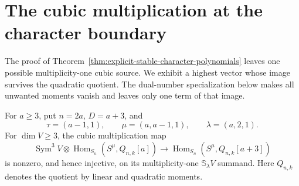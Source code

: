 \section{The cubic multiplication at the character boundary}
\label{app:cubic-witness}

The proof of Theorem~\ref{thm:explicit-stable-character-polynomials}
leaves one possible multiplicity-one cubic source. We exhibit a
highest vector whose image survives the quadratic quotient. The
dual-number specialization below makes all unwanted moments vanish
and leaves only one term of that image.

\begin{lemma}
\label{lem:cubic-witness}
For $a\ge3$, put $n=2a$, $D=a+3$, and
\[
 \tau=(a-1,1),\qquad\mu=(a,a-1,1),\qquad\lambda=(a,2,1).
\]
For $\dim V\ge3$, the cubic multiplication map
\[
 \operatorname{Sym}^3V\otimes
       \operatorname{Hom}_{S_n}(S^\mu,Q_{n,k}[a])
      \longrightarrow\operatorname{Hom}_{S_n}(S^\mu,Q_{n,k}[a+3])
\]
is nonzero, and hence injective, on its multiplicity-one
$\mathbb S_\lambda V$ summand. Here $Q_{n,k}$ denotes the quotient
by linear and quadratic moments.
\end{lemma}
